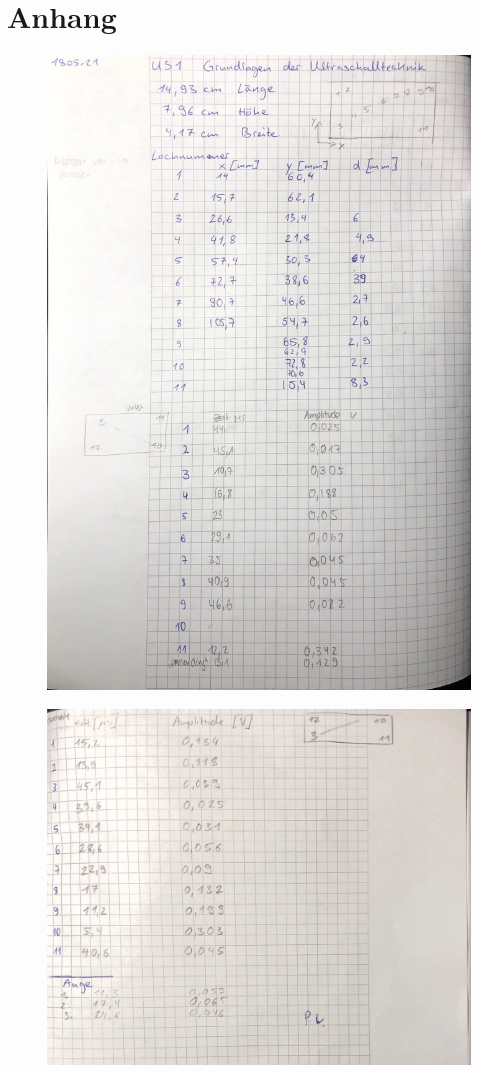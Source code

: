 \section{Anhang}
\label{sec:anhang}

\begin{figure}
    \centering
    \includegraphics[width=\textwidth]{data/daten1.pdf}
\end{figure}
\begin{figure}
    \centering
    \includegraphics[width=\textwidth]{data/daten2.pdf}
\end{figure}